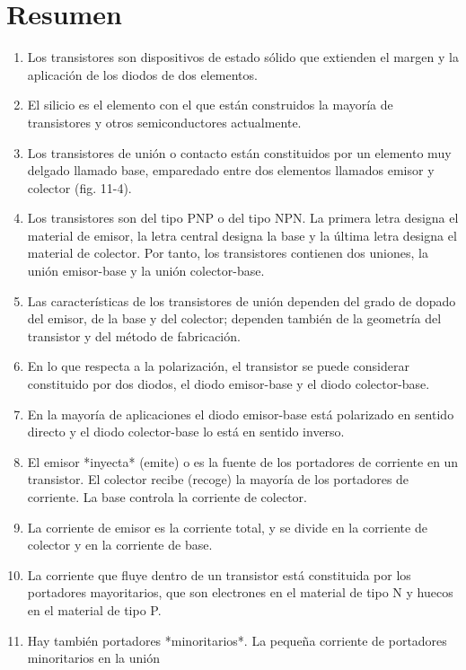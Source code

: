 \documentclass[a4paper,12pt]{article}
\begin{document}
\section{Resumen}
\begin{enumerate}
    \item Los transistores son dispositivos de estado sólido que extienden el margen y la
          aplicación de los diodos de dos elementos.
    \item El silicio es el elemento con el que están construidos la mayoría de transistores
          y otros semiconductores actualmente.
    \item Los transistores de unión o contacto están constituidos por un elemento muy delgado
          llamado base, emparedado entre dos elementos llamados emisor y colector (fig. 11-4).
    \item Los transistores son del tipo PNP o del tipo NPN. La primera letra designa el material
          de emisor, la letra central designa la base y la última letra designa el material de colector.
          Por tanto, los transistores contienen dos uniones, la unión emisor-base y la unión colector-base.
    \item Las características de los transistores de unión dependen del grado de dopado del emisor,
          de la base y del colector; dependen también de la geometría del transistor y del método de fabricación.
    \item En lo que respecta a la polarización, el transistor se puede considerar constituido por
          dos diodos, el diodo emisor-base y el diodo colector-base.
    \item En la mayoría de aplicaciones el diodo emisor-base está polarizado en sentido directo y el
          diodo colector-base lo está en sentido inverso.
    \item El emisor *inyecta* (emite) o es la fuente de los portadores de corriente en un transistor. El
          colector recibe (recoge) la mayoría de los portadores de corriente. La base controla la corriente de colector.
    \item La corriente de emisor es la corriente total, y se divide en la corriente de colector y en
          la corriente de base.
    \item La corriente que fluye dentro de un transistor está constituida por los portadores mayoritarios,
          que son electrones en el material de tipo N y huecos en el material de tipo P.
    \item Hay también portadores *minoritarios*. La pequeña corriente de portadores minoritarios en la unión

\end{enumerate}
\end{document}
